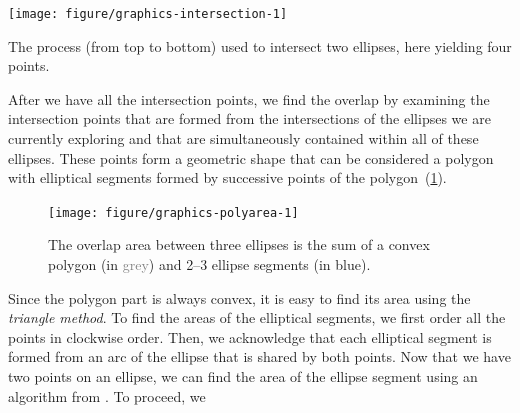 \documentclass[
  a4paper,
  nofonts,
  nobib,
  nohyper,
  openany
]{tufte-book}\usepackage[]{graphicx}\usepackage[]{color}
\newenvironment{knitrout}{}{} %
\begin{document}
\begin{marginfigure}[-40\baselineskip]
\begin{knitrout}
\color{fgcolor}

{\centering \texttt{[image: figure/graphics-intersection-1]} 

}



\end{knitrout}
\caption{The process (from top to bottom) used to intersect two ellipses, here yielding four points.}
\label{fig:intersection}
\end{marginfigure}

After we have all the intersection points, we find the overlap by examining the intersection points that are formed from the intersections of the ellipses we are currently exploring and that are simultaneously contained within all of these ellipses. These points form a geometric shape that can be considered a polygon with elliptical segments formed by successive points of the polygon~(\cref{fig:polyarea}).

\begin{figure}[hbt]
\begin{knitrout}
\color{fgcolor}

{\centering \texttt{[image: figure/graphics-polyarea-1]} 

}



\end{knitrout}
\label{fig:polyarea}
\caption{The overlap area between three ellipses is the sum of a convex polygon (in \textcolor{Grey}{grey}) and 2--3 ellipse segments (in \textcolor{SteelBlue4}{blue}).}
\end{figure}

Since the polygon part is always convex, it is easy to find its area using the \emph{triangle method}. To find the areas of the elliptical segments, we first order all the points in clockwise order. Then, we acknowledge that each elliptical segment is formed from an arc of the ellipse that is shared by both points. Now that we have two points on an ellipse, we can find the area of the ellipse segment using an algorithm from \citet{eberly_area_2016}. To proceed, we
\end{document}
